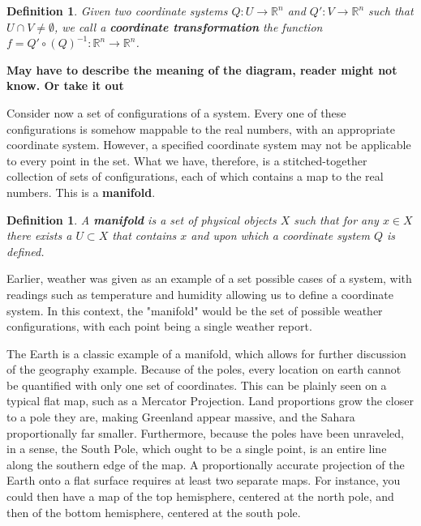 \documentclass{book}
\newtheorem{defn}[equation]{Definition}
\begin{document}
\begin{defn}
	Given two coordinate systems  $Q : U \to \mathbb{R}^n$ and $Q' : V \to \mathbb{R}^n$ such that $U \cap V \neq \emptyset$, we call a \textbf{coordinate transformation} the function $f = Q' \circ (Q)^{-1} : \mathbb{R}^n \to \mathbb{R}^n$.
\end{defn}



\textbf{May have to describe the meaning of the diagram, reader might not know. Or take it out}

Consider now a set of configurations of a system. Every one of these configurations is somehow mappable to the real numbers, with an appropriate coordinate system. However, a specified coordinate system may not be applicable to every point in the set. What we have, therefore, is a stitched-together collection of sets of configurations, each of which contains a map to the real numbers. This is a \textbf{manifold}. 

\begin{defn}
	A \textbf{manifold} is a set of physical objects $X$ such that for any $x \in X$ there exists a $U \subset X$ that contains $x$ and upon which a coordinate system $Q$ is defined.
\end{defn}


Earlier, weather was given as an example of a set possible cases of a system, with readings such as temperature and humidity allowing us to define a coordinate system. In this context, the "manifold" would be the set of possible weather configurations, with each point being a single weather report. 

The Earth is a classic example of a manifold, which allows for further discussion of the geography example. Because of the poles, every location on earth cannot be quantified with only one set of coordinates. This can be plainly seen on a typical flat map, such as a Mercator Projection. Land proportions grow the closer to a pole they are, making Greenland appear massive, and the Sahara proportionally far smaller. Furthermore, because the poles have been unraveled, in a sense, the South Pole, which ought to be a single point, is an entire line along the southern edge of the map. A proportionally accurate projection of the Earth onto a flat surface requires at least two separate maps. For instance, you could then have a map of the top hemisphere, centered at the north pole, and then of the bottom hemisphere, centered at the south pole. 
\end{document}
